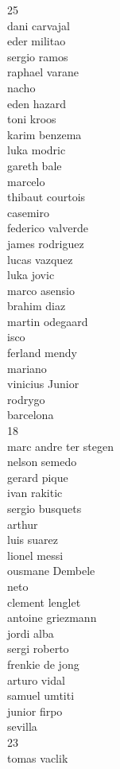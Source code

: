\documentclass[]{article}
\begin{document}
{25\\
dani carvajal\\
eder militao\\
sergio ramos\\
raphael varane\\
nacho\\
eden hazard\\
toni kroos\\
karim benzema\\
luka modric\\
gareth bale\\
marcelo\\
thibaut courtois\\
casemiro\\
federico valverde\\
james rodriguez\\
lucas vazquez\\
luka jovic\\
marco asensio\\
brahim diaz\\
martin odegaard\\
isco\\
ferland mendy\\
mariano\\
vinicius Junior\\
rodrygo\\
barcelona\\
18\\
marc andre ter stegen\\
nelson semedo\\
gerard pique\\
ivan rakitic\\
sergio busquets\\
arthur\\
luis suarez\\
lionel messi\\
ousmane Dembele\\
neto\\
clement lenglet\\
antoine griezmann\\
jordi alba\\
sergi roberto\\
frenkie de jong\\
arturo vidal\\
samuel umtiti\\
junior firpo\\
sevilla\\
23\\
tomas vaclik\\
}
\end{document}
